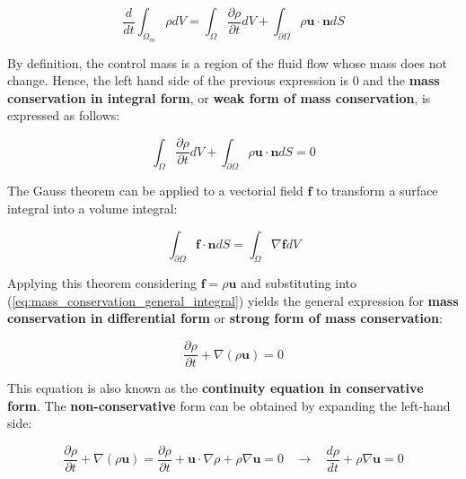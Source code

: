 \begin{equation}
\frac{d}{dt} \int_{\Omega_m} \rho  dV =  \int_\Omega \frac{\partial \rho}{\partial t} dV + \int_{\partial \Omega} \rho \boldsymbol{u} \cdot \boldsymbol{n} dS
\end{equation}

By definition, the control mass is a region of the fluid flow whose mass does not change. Hence, the left hand side of the previous expression is $0$ and the \textbf{mass conservation in integral form}, or \textbf{weak form of mass conservation}, is expressed as follows:


\begin{equation}
\label{eq:mass_conservation_general_integral}
\boxed{
\int_\Omega \frac{\partial \rho}{\partial t}   dV + \int_{\partial \Omega} \rho \boldsymbol{u} \cdot \boldsymbol{n} dS = 0
}
\end{equation}

The Gauss theorem can be applied to a vectorial field $\boldsymbol{f}$ to transform a surface integral into a volume integral:

\begin{equation}
\label{eq:gauss_theorem}
\int_{\partial \Omega} \boldsymbol{f} \cdot \boldsymbol{n} dS = \int_\Omega \nabla \boldsymbol{f}  dV
\end{equation}

Applying this theorem considering $\boldsymbol{f} = \rho \boldsymbol{u}$ and substituting into (\ref{eq:mass_conservation_general_integral}) yields the general expression for \textbf{mass conservation in differential form} or \textbf{strong form of mass conservation}:

\begin{equation}
\label{eq:mass_conservation_general_differential}
\boxed{
\frac{\partial \rho}{\partial t} + \nabla \left( \rho \boldsymbol{u} \right) = 0
}
\end{equation}

This equation is also known as the \textbf{continuity equation in conservative form}. The \textbf{non-conservative} form can be obtained by expanding the left-hand side:

\begin{equation}
\frac{\partial \rho}{\partial t} + \nabla \left( \rho \boldsymbol{u} \right) = \frac{\partial \rho}{\partial t} + \boldsymbol{u} \cdot \nabla \rho  + \rho \nabla \boldsymbol{u} = 0 ~~~~ \rightarrow ~~~~ \frac{d \rho}{d t} + \rho \nabla \boldsymbol{u} = 0
\end{equation}

